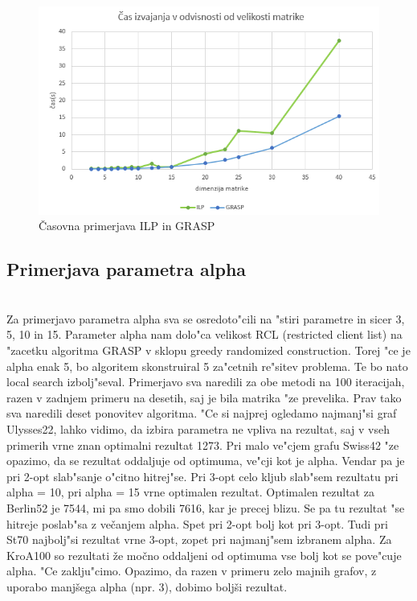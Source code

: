 \documentclass[12pt,a4paper]{amsart}
\theoremstyle{definition} %
\theoremstyle{plain} %
\begin{document}
\begin{figure}[H]
\caption{Časovna primerjava ILP in GRASP}
\centering
\includegraphics[scale =0.8]{casilp}
\end{figure}


\subsection{Primerjava parametra alpha} ~\\
Za primerjavo parametra alpha sva se osredoto"cili na "stiri parametre in sicer 3, 5, 10 in 15. Parameter alpha nam dolo"ca velikost RCL (restricted client list) na "zacetku algoritma GRASP v sklopu greedy randomized construction. Torej "ce je alpha enak 5, bo algoritem skonstruiral 5 za"cetnih re"sitev problema. Te bo nato local search izbolj"seval. Primerjavo sva naredili za obe metodi na 100 iteracijah, razen v zadnjem primeru na desetih, saj je bila matrika "ze prevelika. Prav tako sva naredili deset ponovitev algoritma.
"Ce si najprej ogledamo najmanj"si graf Ulysses22, lahko vidimo, da izbira parametra ne vpliva na rezultat, saj v vseh primerih vrne znan optimalni rezultat 1273. Pri malo ve"cjem grafu Swiss42 "ze opazimo, da se rezultat oddaljuje od optimuma, ve"cji kot je alpha. Vendar pa je pri 2-opt slab"sanje o"citno hitrej"se. Pri 3-opt celo kljub slab"sem rezultatu pri alpha = 10, pri alpha = 15 vrne optimalen rezultat. Optimalen rezultat za Berlin52 je 7544, mi pa smo dobili 7616, kar je precej blizu. Se pa tu rezultat "se hitreje poslab"sa z večanjem alpha. Spet pri 2-opt bolj kot pri 3-opt. Tudi pri St70 najbolj"si rezultat vrne 3-opt, zopet pri najmanj"sem izbranem alpha. 
Za KroA100 so rezultati že močno oddaljeni od optimuma vse bolj kot se pove"cuje alpha. 
"Ce zaklju"cimo. Opazimo, da razen v primeru zelo majnih grafov, z uporabo manjšega alpha (npr. 3), dobimo boljši rezultat. 
\end{document}
